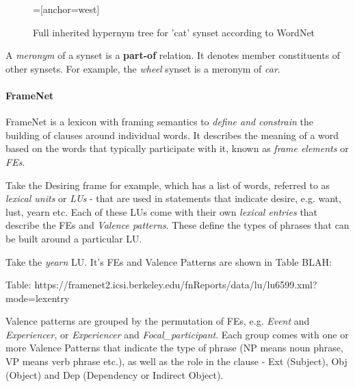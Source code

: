 \begin{figure}[h!]
\centering
{}=[anchor=west]
\caption{Full inherited hypernym tree for 'cat' synset according to WordNet}
\label{fig:hypernym-tree-cat}
\end{figure}

A \textit{meronym} of a synset is a \textbf{part-of} relation. It denotes member constituents of other synsets. For example, the \textit{wheel} synset is a meronym of \textit{car}.


\paragraph{FrameNet}
FrameNet\cite{baker1998berkeley} is a lexicon with framing semantics to \textit{define and constrain} the building of clauses around individual words. It describes the meaning of a word based on the words that typically participate with it, known as \textit{frame elements} or \textit{FEs}.

Take the Desiring frame for example, which has a list of words, referred to as \textit{lexical units} or \textit{LUs} - that are used in statements that indicate desire, e.g. want, lust, yearn etc. Each of these LUs come with their own \textit{lexical entries} that describe the FEs and \textit{Valence patterns}. These define the types of phrases that can be built around a particular LU.

Take the \textit{yearn} LU. It's FEs and Valence Patterns are shown in Table BLAH:

Table: https://framenet2.icsi.berkeley.edu/fnReports/data/lu/lu6599.xml?mode=lexentry

Valence patterns are grouped by the permutation of FEs, e.g. \textit{Event} and \textit{Experiencer}, or \textit{Experiencer} and \textit{Focal\_participant}. Each group comes with one or more Valence Patterns that indicate the type of phrase (NP means noun phrase, VP means verb phrase etc.), as well as the role in the clause - Ext (Subject), Obj (Object) and Dep (Dependency or Indirect Object).

